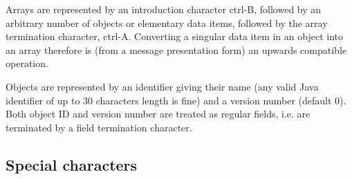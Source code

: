 \documentclass[11pt,a4paper,oneside]{article}
\begin{document}
Arrays are represented by an introduction character ctrl-B, followed by an
arbitrary number of objects or elementary data items, followed by the array
termination character, ctrl-A. Converting a singular data item in an object into
an array therefore is (from a message presentation form) an upwards compatible operation. 

Objects are represented by an identifier giving their name (any valid Java
identifier of up to 30 characters length is fine) and a version number (default
0). Both object ID and version number are treated as regular fields, i.e. are
terminated by a field termination character. 

\subsection{Special characters}
\end{document}
